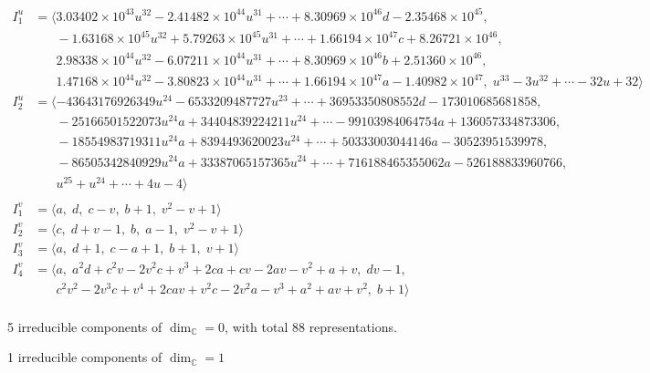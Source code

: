 \documentclass[1p]{elsarticle_modified}
\theoremstyle{definition}
\begin{document}
\begin{align*}
I^u_{1}&=\langle 
3.03402\times10^{43} u^{32}-2.41482\times10^{44} u^{31}+\cdots+8.30969\times10^{46} d-2.35468\times10^{45},\\
\phantom{I^u_{1}}&\phantom{= \langle  }-1.63168\times10^{45} u^{32}+5.79263\times10^{45} u^{31}+\cdots+1.66194\times10^{47} c+8.26721\times10^{46},\\
\phantom{I^u_{1}}&\phantom{= \langle  }2.98338\times10^{44} u^{32}-6.07211\times10^{44} u^{31}+\cdots+8.30969\times10^{46} b+2.51360\times10^{46},\\
\phantom{I^u_{1}}&\phantom{= \langle  }1.47168\times10^{44} u^{32}-3.80823\times10^{44} u^{31}+\cdots+1.66194\times10^{47} a-1.40982\times10^{47},\;u^{33}-3 u^{32}+\cdots-32 u+32\rangle \\
I^u_{2}&=\langle 
-43643176926349 u^{24}-6533209487727 u^{23}+\cdots+36953350808552 d-173010685681858,\\
\phantom{I^u_{2}}&\phantom{= \langle  }-25166501522073 u^{24} a+34404839224211 u^{24}+\cdots-99103984064754 a+136057334873306,\\
\phantom{I^u_{2}}&\phantom{= \langle  }-18554983719311 u^{24} a+8394493620023 u^{24}+\cdots+50333003044146 a-30523951539978,\\
\phantom{I^u_{2}}&\phantom{= \langle  }-86505342840929 u^{24} a+33387065157365 u^{24}+\cdots+716188465355062 a-526188833960766,\\
\phantom{I^u_{2}}&\phantom{= \langle  }u^{25}+u^{24}+\cdots+4 u-4\rangle \\
\\
I^v_{1}&=\langle 
a,\;d,\;c- v,\;b+1,\;v^2- v+1\rangle \\
I^v_{2}&=\langle 
c,\;d+v-1,\;b,\;a-1,\;v^2- v+1\rangle \\
I^v_{3}&=\langle 
a,\;d+1,\;c- a+1,\;b+1,\;v+1\rangle \\
I^v_{4}&=\langle 
a,\;a^2 d+c^2 v-2 v^2 c+v^3+2 c a+c v-2 a v- v^2+a+v,\;d v-1,\\
\phantom{I^v_{4}}&\phantom{= \langle  }c^2 v^2-2 v^3 c+v^4+2 c a v+v^2 c-2 v^2 a- v^3+a^2+a v+v^2,\;b+1\rangle \\
\end{align*}
\raggedright * 5 irreducible components of $\dim_{\mathbb{C}}=0$, with total 88 representations.\\
\raggedright * 1 irreducible components of $\dim_{\mathbb{C}}=1$ \\
\end{document}
